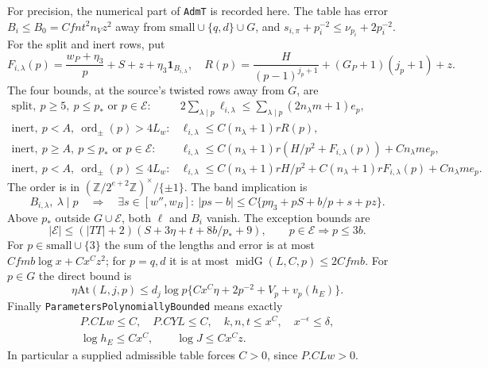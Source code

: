\documentclass[11pt,a4paper]{article}
\numberwithin{equation}{section}
\theoremstyle{remark}\newtheorem{remark}[theorem]{Remark}
\begin{document}
For precision, the numerical part of \texttt{Adm\allowbreak T} is recorded here.
The table has error $B_i\le B_0=Cfnt^2n_Vz^2$ away from
$\mathrm{small}\cup\{q,d\}\cup G$, and
$s_{i,\pi}+p_i^{-2}\le\nu_{p_i}+2p_i^{-2}$.
For the split and inert rows, put
\[
 F_{i,\lambda}(p)=\frac{w_P+\eta_3}{p}+S+z+
                          \eta_3\mathbf1_{B_{i,\lambda}},
 \quad R(p)=\frac H{(p-1)^{j_p+1}}+(G_P+1)(j_p+1)+z.     \tag{DNE.11}
\]
The four bounds, at the source's twisted rows away from $G$, are
\[
\begin{array}{ll}
\text{split},\ p\ge5,\ p\le p_*\text{ or }p\in\mathcal E:
 &2\sum_{\lambda\mid p}\ell_{i,\lambda}
       \le\sum_{\lambda\mid p}(2n_\lambda m+1)e_p,\\[2pt]
\text{inert},\ p<A,\ \operatorname{ord}_{\pm}(p)>4L_w:
 &\ell_{i,\lambda}\le C(n_\lambda+1)rR(p),\\[2pt]
\text{inert},\ p\ge A,\ p\le p_*\text{ or }p\in\mathcal E:
 &\ell_{i,\lambda}\le C(n_\lambda+1)r(H/p^2+F_{i,\lambda}(p))
                              +Cn_\lambda m e_p,\\[2pt]
\text{inert},\ p<A,\ \operatorname{ord}_{\pm}(p)\le4L_w:
 &\ell_{i,\lambda}\le C(n_\lambda+1)rH/p^2
       +C(n_\lambda+1)rF_{i,\lambda}(p)+Cn_\lambda m e_p.
\end{array}                                                     \tag{DNE.12}
\]
The order is in
$(\mathbb Z/2^{e+2}\mathbb Z)^\times/\{\pm1\}$.
The band implication is
\[
 B_{i,\lambda},\ \lambda\mid p\quad\Longrightarrow\quad
 \exists s\in[w'',w_B]:\ |ps-b|
   \le C\{p\eta_3+pS+b/p+s+pz\}.                       \tag{DNE.13}
\]
Above $p_*$ outside $G\cup\mathcal E$, both $\ell$ and $B_i$ vanish.
The exception bounds are
\[
 |\mathcal E|\le(|TT|+2)(S+3\eta+t+8b/p_*+9),\qquad
                    p\in\mathcal E\Longrightarrow p\le3b.       \tag{DNE.14}
\]
For $p\in\mathrm{small}\cup\{3\}$ the sum of the lengths and
error is at most $Cfm b\log x+Cx^Cz^2$; for $p=q,d$ it is at most
$\operatorname{midG}(L,C,p)\le2Cfm b$.
For $p\in G$ the direct bound is
\[
 \eta\mathrm{At}(L,j,p)\le
    d_j\log p\{Cx^C\eta+2p^{-2}+V_p+v_p(h_E)\}.        \tag{DNE.15}
\]
Finally \texttt{Parameters\allowbreak Polynomially\allowbreak Bounded} means exactly
\[
 \begin{gathered}
  P.CLw\le C,\quad P.CYL\le C,\quad k,n,t\le x^C,
  \quad x^{-\epsilon}\le\delta,\\
  \log h_E\le Cx^C,\qquad \log J\le Cx^Cz .
 \end{gathered}                                                   \tag{DNE.16}
\]
In particular a supplied admissible table forces $C>0$, since
$P.CLw>0$.
\end{document}
